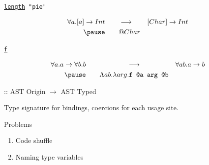 \documentclass[pdf]{beamer}
\begin{document}
\begin{frame}
  \begin{center}
    \texttt{\underline{length} "pie"}
  \end{center}
  \pause
   {  }
  \begin{align*}
    \forall a. [a] \rightarrow Int & \qquad \longrightarrow & [Char] \rightarrow Int \\
    \pause
    & \qquad @Char \\
  \end{align*}
\end{frame}

\begin{frame}
  \begin{center}
    \texttt{\underline{f}}
  \end{center}
  \pause
   {  }
  \begin{align*}
    \forall a. a \rightarrow \forall b. b & \qquad \qquad \qquad \longrightarrow & \forall a b. a \rightarrow b\\
    \pause
    & \qquad \Lambda a b. \lambda arg. \texttt{f @a arg @b} \\
  \end{align*}
\end{frame}

\begin{frame}
   :: AST Origin $\rightarrow$ AST Typed

  Type signature for bindings, coercions for each usage site.
\end{frame}

\begin{frame}{Problems}
   {  }
  \begin{enumerate}
    \item Code shuffle

    \item Naming type variables

  \end{enumerate}
\end{frame}
\end{document}
